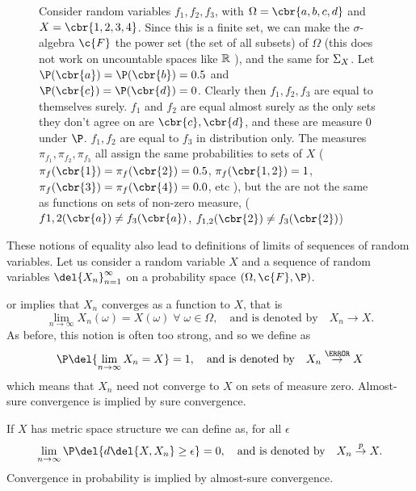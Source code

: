 \begin{figure}
	\centering
	\hspace{0.5in}\hfill\hfill \hspace{0.5in}
	\caption{Consider random variables \(f_1,f_2,f_3\), with \(\Omega=\cbr{a,b,c,d}\) and \(X=\cbr{1,2,3,4}\). Since this is a finite set, we can make the \(\sigma\)-algebra \(\c{F}\) the power set (the set of all subsets) of \(\Omega\) (this does not work on uncountable spaces like \(\mathbb{R}\)
	), and the same for \(\Sigma_{X}\). Let \(\P(\cbr{a}) = \P(\cbr{b}) = 0.5\) and \(\P(\cbr{c}) = \P(\cbr{d}) = 0\). Clearly then \(f_1,f_2, f_3\) are equal to themselves surely. \(f_1\) and \(f_2\) are equal almost surely as the only sets they don't agree on are \(\cbr{c}, \cbr{d}\), and these are measure 0 under \(\P\). \(f_1,f_2\) are equal to \(f_3\) in distribution only. The measures \(\pi_{f_1}, \pi_{f_2}, \pi_{f_3}\) all assign the same probabilities to sets of \(X\) (\(\pi_f(\cbr{1}) = \pi_f(\cbr{2}) = 0.5\), \(\pi_f(\cbr{1,2}) = 1\),  \(\pi_f(\cbr{3}) = \pi_f(\cbr{4}) = 0.0\), etc ), but the are not the same as functions on sets of non-zero measure, (\(f{1,2}(\cbr{a}) \neq f_3(\cbr{a})\), \(f_{1,2}(\cbr{2})\neq f_3(\cbr{2})\))}
\end{figure}

These notions of equality also lead to definitions of limits of sequences of random variables.
Let us consider a random variable \(X\) and a sequence of random variables \(\del{X_n}_{n=1}^\infty\) on a probability space \((\Omega, \c{F}, \P)\).

 or  implies that \(X_n\) converges as a function to \(X\), that is
\[
	\lim_{n\to\infty} X_n(\omega) = X(\omega)\;\forall\;\omega\in\Omega, \quad \text{and is denoted by} \quad X_n \to X
.\]
As before, this notion is often too strong, and so we define  as
\[
	\P\del{\lim_{n\to\infty} X_n = X} = 1, \quad \text{and is denoted by} \quad X_n \overset{\as}{\to} X
\]
which means that \(X_n\) need not converge to \(X\) on sets of measure zero.
Almost-sure convergence is implied by sure convergence.

If \(X\) has metric space structure we can define  as, for all \(\epsilon\)
\[
	\lim_{n\to\infty}{\P\del{d\del{X, X_n} \geq \epsilon}} = 0, \quad \text{and is denoted by} \quad X_n \overset{p}{\to} X
.\]
Convergence in probability is implied by almost-sure convergence.

